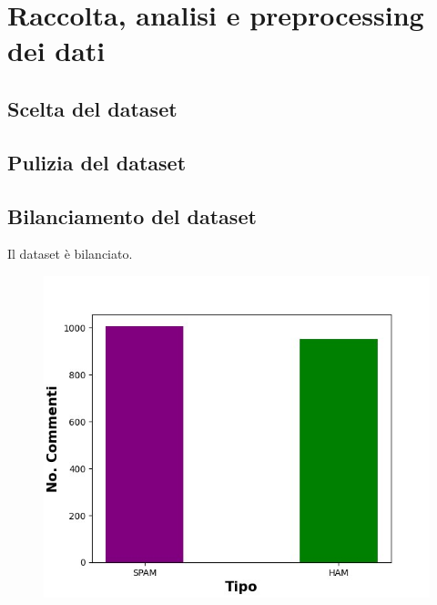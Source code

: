 \documentclass{report}
\begin{document}
    

                        


   
    \chapter{Raccolta, analisi e preprocessing dei dati}
    \section{Scelta del dataset}
    \section{Pulizia del dataset}
    \section{Bilanciamento del dataset}
    Il dataset è bilanciato.
    \begin{figure}
        \includegraphics[width=0.7\columnwidth]{immagini/datasetMergiato.jpg}
    \end{figure}
\end{document}
